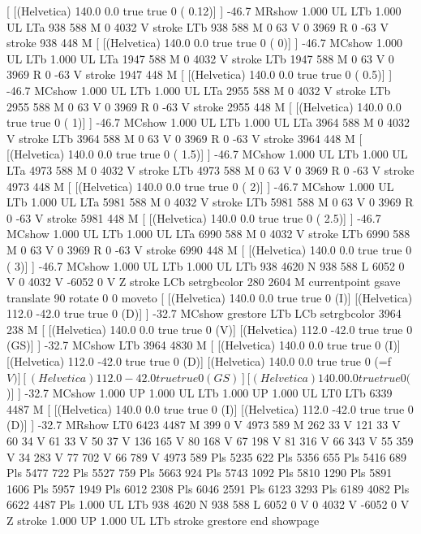 [ [(Helvetica) 140.0 0.0 true true 0 ( 0.12)]
] -46.7 MRshow
1.000 UL
LTb
1.000 UL
LTa
938 588 M
0 4032 V
stroke
LTb
938 588 M
0 63 V
0 3969 R
0 -63 V
stroke
938 448 M
[ [(Helvetica) 140.0 0.0 true true 0 ( 0)]
] -46.7 MCshow
1.000 UL
LTb
1.000 UL
LTa
1947 588 M
0 4032 V
stroke
LTb
1947 588 M
0 63 V
0 3969 R
0 -63 V
stroke
1947 448 M
[ [(Helvetica) 140.0 0.0 true true 0 ( 0.5)]
] -46.7 MCshow
1.000 UL
LTb
1.000 UL
LTa
2955 588 M
0 4032 V
stroke
LTb
2955 588 M
0 63 V
0 3969 R
0 -63 V
stroke
2955 448 M
[ [(Helvetica) 140.0 0.0 true true 0 ( 1)]
] -46.7 MCshow
1.000 UL
LTb
1.000 UL
LTa
3964 588 M
0 4032 V
stroke
LTb
3964 588 M
0 63 V
0 3969 R
0 -63 V
stroke
3964 448 M
[ [(Helvetica) 140.0 0.0 true true 0 ( 1.5)]
] -46.7 MCshow
1.000 UL
LTb
1.000 UL
LTa
4973 588 M
0 4032 V
stroke
LTb
4973 588 M
0 63 V
0 3969 R
0 -63 V
stroke
4973 448 M
[ [(Helvetica) 140.0 0.0 true true 0 ( 2)]
] -46.7 MCshow
1.000 UL
LTb
1.000 UL
LTa
5981 588 M
0 4032 V
stroke
LTb
5981 588 M
0 63 V
0 3969 R
0 -63 V
stroke
5981 448 M
[ [(Helvetica) 140.0 0.0 true true 0 ( 2.5)]
] -46.7 MCshow
1.000 UL
LTb
1.000 UL
LTa
6990 588 M
0 4032 V
stroke
LTb
6990 588 M
0 63 V
0 3969 R
0 -63 V
stroke
6990 448 M
[ [(Helvetica) 140.0 0.0 true true 0 ( 3)]
] -46.7 MCshow
1.000 UL
LTb
1.000 UL
LTb
938 4620 N
938 588 L
6052 0 V
0 4032 V
-6052 0 V
Z stroke
LCb setrgbcolor
280 2604 M
currentpoint gsave translate 90 rotate 0 0 moveto
[ [(Helvetica) 140.0 0.0 true true 0 (I)]
[(Helvetica) 112.0 -42.0 true true 0 (D)]
] -32.7 MCshow
grestore
LTb
LCb setrgbcolor
3964 238 M
[ [(Helvetica) 140.0 0.0 true true 0 (V)]
[(Helvetica) 112.0 -42.0 true true 0 (GS)]
] -32.7 MCshow
LTb
3964 4830 M
[ [(Helvetica) 140.0 0.0 true true 0 (I)]
[(Helvetica) 112.0 -42.0 true true 0 (D)]
[(Helvetica) 140.0 0.0 true true 0 (=f\(V)]
[(Helvetica) 112.0 -42.0 true true 0 (GS)]
[(Helvetica) 140.0 0.0 true true 0 (\))]
] -32.7 MCshow
1.000 UP
1.000 UL
LTb
1.000 UP
1.000 UL
LT0
LTb
6339 4487 M
[ [(Helvetica) 140.0 0.0 true true 0 (I)]
[(Helvetica) 112.0 -42.0 true true 0 (D)]
] -32.7 MRshow
LT0
6423 4487 M
399 0 V
4973 589 M
262 33 V
121 33 V
60 34 V
61 33 V
50 37 V
136 165 V
80 168 V
67 198 V
81 316 V
66 343 V
55 359 V
34 283 V
77 702 V
66 789 V
4973 589 Pls
5235 622 Pls
5356 655 Pls
5416 689 Pls
5477 722 Pls
5527 759 Pls
5663 924 Pls
5743 1092 Pls
5810 1290 Pls
5891 1606 Pls
5957 1949 Pls
6012 2308 Pls
6046 2591 Pls
6123 3293 Pls
6189 4082 Pls
6622 4487 Pls
1.000 UL
LTb
938 4620 N
938 588 L
6052 0 V
0 4032 V
-6052 0 V
Z stroke
1.000 UP
1.000 UL
LTb
stroke
grestore
end
showpage
